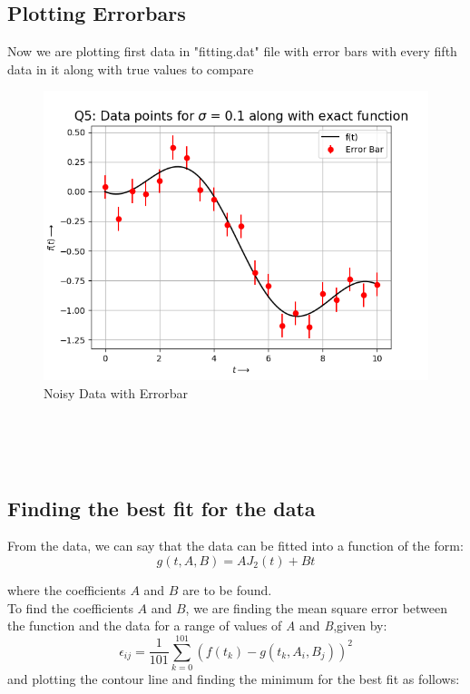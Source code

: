 \documentclass[11pt, a4paper]{article}
\begin{document}
    \subsection{Plotting Errorbars}
            Now we are plotting first data in "fitting.dat" file with error bars with every fifth data in it along with true values to compare
            \begin{figure}[H]
                \centering
                \includegraphics[scale=0.5]{q5_plot.png}
                \caption{Noisy Data with Errorbar}
                \label{fig:noiseError}
            \end{figure}
        \\
        \\
        \\
        
            

        \subsection{Finding the best fit for the data}
            From the data, we can say that the data can be fitted into a function of the form:
            \begin{equation}
                g(t, A, B) = AJ_2(t)+Bt
            \end{equation}
            
            where the coefficients $A$ and $B$ are  to be found.\\

            To find the coefficients $A$ and $B$, we are finding the mean square error between the function and the data for a range of values of \textit{A} and \textit{B},given by:
            \begin{equation}
           \epsilon_{ij} = \frac{1}{101}\sum_{k=0}^{101}(f(t_k) - g(t_k, A_i, B_j))^2 
        \end{equation}
        and plotting the contour line and finding the minimum for the best fit as follows:
        
\end{document}
